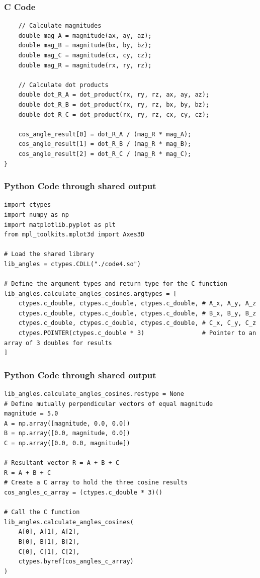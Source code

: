 \documentclass{beamer}
\begin{document}
\begin{frame}[fragile]
\frametitle{C Code}
\begin{lstlisting}
    // Calculate magnitudes
    double mag_A = magnitude(ax, ay, az);
    double mag_B = magnitude(bx, by, bz);
    double mag_C = magnitude(cx, cy, cz);
    double mag_R = magnitude(rx, ry, rz);

    // Calculate dot products
    double dot_R_A = dot_product(rx, ry, rz, ax, ay, az);
    double dot_R_B = dot_product(rx, ry, rz, bx, by, bz);
    double dot_R_C = dot_product(rx, ry, rz, cx, cy, cz);

    cos_angle_result[0] = dot_R_A / (mag_R * mag_A); 
    cos_angle_result[1] = dot_R_B / (mag_R * mag_B); 
    cos_angle_result[2] = dot_R_C / (mag_R * mag_C);
}
\end{lstlisting}
\end{frame}



\begin{frame}[fragile]
\frametitle{Python Code through shared output}
\begin{lstlisting}
import ctypes
import numpy as np
import matplotlib.pyplot as plt
from mpl_toolkits.mplot3d import Axes3D

# Load the shared library
lib_angles = ctypes.CDLL("./code4.so")

# Define the argument types and return type for the C function
lib_angles.calculate_angles_cosines.argtypes = [
    ctypes.c_double, ctypes.c_double, ctypes.c_double, # A_x, A_y, A_z
    ctypes.c_double, ctypes.c_double, ctypes.c_double, # B_x, B_y, B_z
    ctypes.c_double, ctypes.c_double, ctypes.c_double, # C_x, C_y, C_z
    ctypes.POINTER(ctypes.c_double * 3)                # Pointer to an array of 3 doubles for results
]
\end{lstlisting}
\end{frame}



\begin{frame}[fragile]
\frametitle{Python Code through shared output}
\begin{lstlisting}
lib_angles.calculate_angles_cosines.restype = None
# Define mutually perpendicular vectors of equal magnitude
magnitude = 5.0
A = np.array([magnitude, 0.0, 0.0])
B = np.array([0.0, magnitude, 0.0])
C = np.array([0.0, 0.0, magnitude])

# Resultant vector R = A + B + C
R = A + B + C
# Create a C array to hold the three cosine results
cos_angles_c_array = (ctypes.c_double * 3)()

# Call the C function
lib_angles.calculate_angles_cosines(
    A[0], A[1], A[2],
    B[0], B[1], B[2],
    C[0], C[1], C[2],
    ctypes.byref(cos_angles_c_array)
)
\end{lstlisting}
\end{frame}
\end{document}
